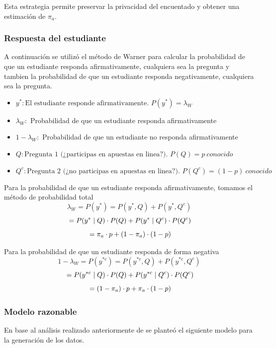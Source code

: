 \documentclass[
]{article}
\begin{document}
Esta estrategia permite preservar la privacidad del encuentado y obtener
una estimación de \(\pi_a\).

\subsubsection{Respuesta del estudiante}\label{subtitulo-4}

A continuación se utilizó el método de Warner para calcular la probabilidad de que un estudiante responda afirmativamente, cualquiera sea la pregunta y tambien la probabilidad de que un estudiante responda negativamente, cualquiera sea la pregunta.

\begin{itemize}
\item
  \(y^* : \text{El estudiante responde afirmativamente. } P(y^*) = \lambda_W\)
\item
  \(\lambda_W :\) Probabilidad de que un estudiante responda
  afirmativamente
\item
  \(1 - \lambda_W :\) Probabilidad de que un estudiante no responda
  afirmativamente
\item
  \(Q : \text{Pregunta 1 (¿participas en apuestas en linea?). } P(Q)=p \ conocido\)
\item
  \(Q^c : \text{Pregunta 2 (¿no participas en apuestas en linea?). } P(Q^c)=(1-p) \ conocido\)
\end{itemize}

Para la probabilidad de que un estudiante responda afirmativamente,
tomamos el método de probabilidad total
\[ \lambda_W = P(y^*) = P(y^*,Q) + P(y^*,Q^c)\]
\[\\ = P(y^* \mid Q) \cdot P(Q) + P(y^* \mid Q^c) \cdot P(Q^c) \]
\[\\= \pi_a \cdot p + (1 - \pi_a) \cdot (1 - p)\]

Para la probabilidad de que un estudiante responda de forma negativa
\[ 1 - \lambda_W = P(y^{*c}) = P(y^{*c},Q) + P(y^{*c},Q^c)\]
\[\\ = P(y^{*c} \mid Q) \cdot P(Q) + P(y^{*c} \mid Q^c) \cdot P(Q^c) \]
\[\\= (1 - \pi_a) \cdot p + \pi_a \cdot (1 - p)\]

\subsubsection{Modelo razonable}\label{subtitulo-5}

En base al análisis realizado anteriormente de se planteó el siguiente modelo para la generación de los datos.
\end{document}

